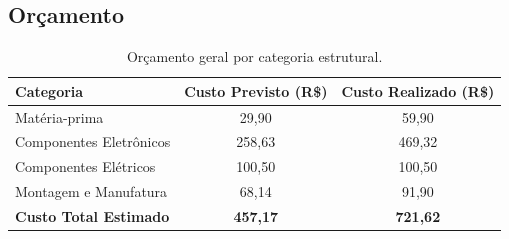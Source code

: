 \begin{landscape}

\chapter{Orçamento}
\vspace{-1cm}
\begin{table}[H]
\centering
\caption{Orçamento geral por categoria estrutural.}
\label{tab:orcamento_geral}
\renewcommand{\arraystretch}{1.3}
\begin{tabular}{|l|c|c|}
\hline
\textbf{Categoria} & \textbf{Custo Previsto (R\$)} & \textbf{Custo Realizado (R\$)} \\ \hline
Matéria-prima & 29,90 & 59,90 \\ \hline
Componentes Eletrônicos & 258,63 & 469,32 \\ \hline
Componentes Elétricos & 100,50 & 100,50 \\ \hline
Montagem e Manufatura & 68,14 & 91,90 \\ \hline
\textbf{Custo Total Estimado} & \textbf{457,17} & \textbf{721,62} \\ \hline
\end{tabular}
\end{table}

\vspace{0.5cm}


\end{landscape}
